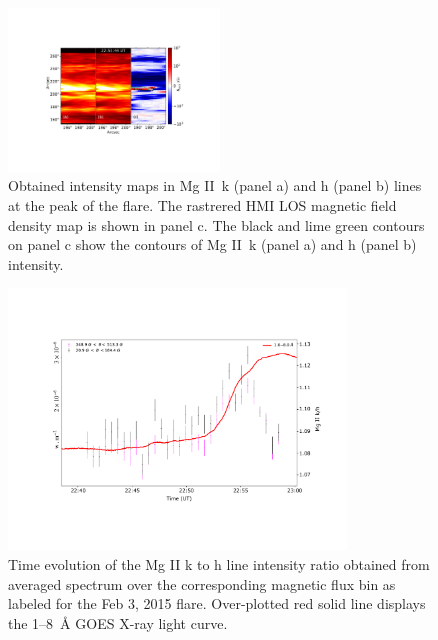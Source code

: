 \begin{figure}[ht!]
    \centering
\includegraphics[width=0.5\textwidth,trim={4cm 5cm 4cm 4cm},clip]{Figures/contour_paper_plot_feb-03-2015.pdf}
\caption{Obtained intensity maps in Mg II~k (panel a) and h (panel b) lines at the peak of the flare. The rastrered HMI LOS magnetic field density map is shown in panel c. The black and lime green contours on panel c show the contours of Mg II~k (panel a) and h (panel b) intensity.}
\label{fig:align_raster_flare3}
\end{figure}

\begin{figure}[ht!]
    \centering
    \includegraphics[trim={2cm 3cm 2cm 3cm},clip,width=0.8\textwidth]{Figures/Feb-04-2015-optical-dep-ev-2.pdf}
    \caption{Time evolution of the Mg II k to h line intensity ratio obtained from averaged spectrum over the corresponding magnetic flux bin as labeled for the Feb 3, 2015 flare. Over-plotted red solid line displays the 1{--}8~{\AA} GOES X-ray light curve.}
    \label{fig:optical_dep_ev_c}
\end{figure}

